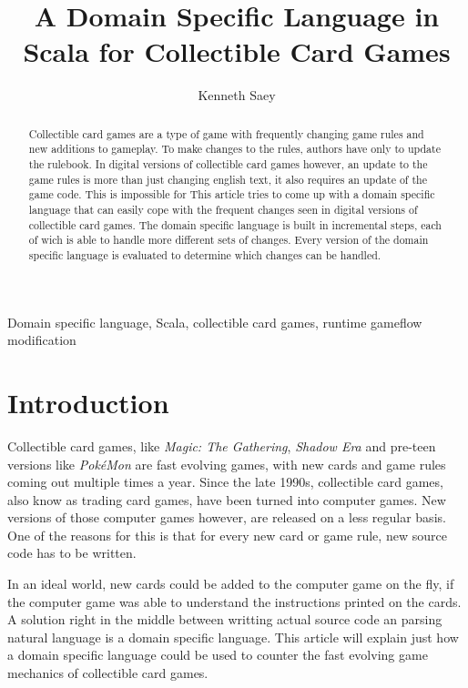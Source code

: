 \documentclass[twocolumn]{phdsymp}
\begin{document}
\title{A Domain Specific Language in Scala for Collectible Card Games} %

\author{Kenneth Saey}


\maketitle

\begin{abstract}
Collectible card games are a type of game with frequently changing game rules and new additions to gameplay. To make changes to the rules, authors have only to update the rulebook. In digital versions of collectible card games however, an update to the game rules is more than just changing english text, it also requires an update of the game code. This is impossible for 
This article tries to come up with a domain specific language that can easily cope with the frequent changes seen in digital versions of collectible card games. The domain specific language is built in incremental steps, each of wich is able to handle more different sets of changes. Every version of the domain specific language is evaluated to determine which changes can be handled.
\end{abstract}

\begin{keywords}
Domain specific language, Scala, collectible card games, runtime gameflow modification
\end{keywords}

\section{Introduction}
Collectible card games, like \textit{Magic: The Gathering}, \textit{Shadow Era} and pre-teen versions like \textit{Pok\'eMon} are fast evolving games, with new cards and game rules coming out multiple times a year. Since the late 1990s, collectible card games, also know as trading card games, have been turned into computer games. New versions of those computer games however, are released on a less regular basis. One of the reasons for this is that for every new card or game rule, new source code has to be written.

In an ideal world, new cards could be added to the computer game on the fly, if the computer game was able to understand the instructions printed on the cards. A solution right in the middle between writting actual source code an parsing natural language is a domain specific language. This article will explain just how a domain specific language could be used to counter the fast evolving game mechanics of collectible card games.
\end{document}
